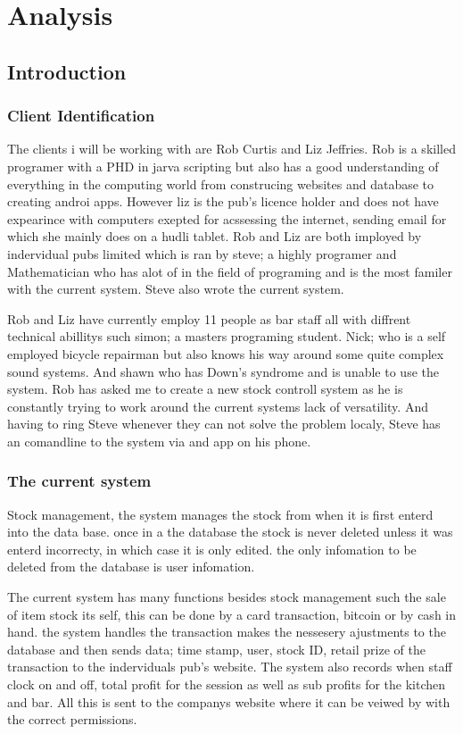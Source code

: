 \chapter{Analysis}

\section{Introduction}

\subsection{Client Identification}

The clients i will be working with are Rob Curtis and Liz Jeffries. Rob is a skilled programer with a PHD in jarva scripting but also has a good understanding of everything in the computing world from construcing websites and database to creating androi apps. However liz is the pub's licence holder and does not have expearince with computers exepted for acssessing the internet, sending email for which she mainly does on a hudli tablet. Rob and Liz are both imployed by indervidual pubs limited which is ran by steve; a highly programer and Mathematician who has alot of in the field of programing and is the most familer with the current system. Steve also wrote the current system.

Rob and Liz have currently employ 11 people as bar staff all with diffrent technical abillitys such simon; a masters programing student. Nick; who is a self employed bicycle repairman but also knows his way around some quite complex sound systems. And shawn who has Down's syndrome and is unable to use the system. Rob has asked me to create a new stock controll system as he is constantly trying to work around the current systems lack of versatility. And having to ring Steve whenever they can not solve the problem localy, Steve has an comandline to the system via and app on his phone.

\subsection{The current system}

Stock management, the system manages the stock from when it is first enterd into the data base. once in a the database the stock is never deleted unless it was enterd incorrecty, in which case it is only edited. the only infomation to be deleted from the database is user infomation.

The current system has many functions besides stock management such the sale of item stock its self, this can be done by a card transaction, bitcoin or by cash in hand. the system handles the transaction makes the nessesery ajustments to the database and then sends data; time stamp, user, stock ID, retail prize of the transaction to the inderviduals pub's website. The system also records when staff clock on and off, total profit for the session as well as sub profits for the kitchen and bar. All this is sent to the companys website where it can be veiwed by with the correct permissions.

